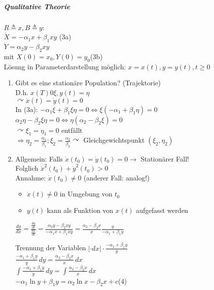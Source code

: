 \documentclass[a4paper]{scrartcl}
\begin{document}
\subparagraph{Qualitative Theorie}
$R \triangleq x, B \triangleq y$:\\
$\dot{X} = - \alpha_1 x + \beta_1 xy$ (3a)\\
$\dot{Y} = \alpha_2 y - \beta_2 xy$\\
mit $X(0) = x_0, Y(0) = y_0$(3b)\\
Lösung in Parameterdarstellung möglich: $x=x(t), y=y(t), t \geq 0$
\begin{enumerate}
\item Gibt es eine stationäre Population? (Trajektorie)\\
D.h. $x(T) 0 \xi , y(t) = \eta$\\
$\curvearrowright \dot{x}(t) = \dot{y}(t) = 0$\\
In (3a): $-\alpha_1 \xi + \beta_1 \xi \eta = 0 \Leftrightarrow \xi (- \alpha_1 + \beta_1 \eta) = 0$\\
$\alpha_2 \eta - \beta_2 \xi \eta = 0 \Leftrightarrow \eta ( \alpha_2 - \beta_2 \xi) = 0$\\
$\curvearrowright \xi_1 = \eta_1 = 0$ entfällt\\
$\Rightarrow \eta_2 = \frac{\alpha_1}{\beta_1} ; \xi_2 = \frac{\alpha_2}{\beta_2} \curvearrowright $ Gleichgewichtspunkt $(\xi_2,\eta_2)$

\item Allgemein: Falls $\dot{x}(t_0) = \dot{y} (t_0) = 0 \rightarrow$ Stationärer Fall!\\
Folglich $\dot{x}^2 (t_0) + \dot{y}^2 (t_0) > 0$\\
Annahme: $\dot{x}(t_0) \neq 0$ (anderer Fall: analog!)
\begin{itemize}
	\item $\dot{x} (t) \neq 0$ in Umgebung von $t_0$
	\item $y(t)$ kann als Funktion von $x(t)$ aufgefasst werden
\end{itemize}
$\frac{dy}{dx} = \frac{\frac{dy}{dt}}{\frac{dx}{dt}} = \frac{\alpha_2 y - \beta_2 xy}{-\alpha_1 x + \beta_1 xy} = \frac{\alpha_2 - \beta_2 x}{x} \frac{y}{-\alpha_1 + \beta_1 y}$

Trennung der Variablen $| \cdot dx | \cdot \frac{-\alpha_1 + \beta_1 y}{y}$\\
$\frac{-\alpha_1 + \beta_1 y}{y} \, dy = \frac{\alpha_2 - \beta_2 x}{x}\, dx$\\
$\int \frac{-\alpha_1 + \beta_1 y}{y} \, dy = \int \frac{\alpha_2 - \beta_2 x}{x} \, dx$\\
$-\alpha_1 \ln y + \beta_1 y = \alpha_2 \ln x - \beta_2 x + c$(4)


\end{enumerate}
\end{document}

